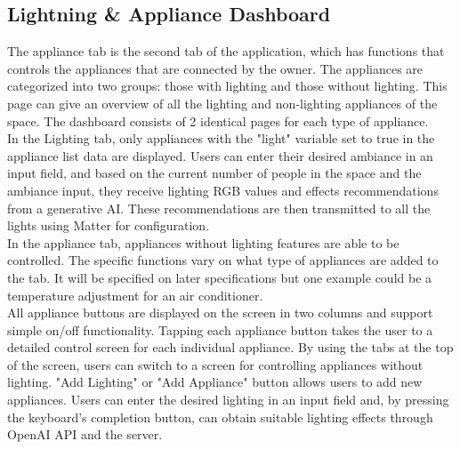 \documentclass[conference]{IEEEtran}
\begin{document}
    \subsection{Lightning \& Appliance Dashboard}
        The appliance tab is the second tab of the application, which has functions that controls the appliances that are connected by the owner. The appliances are categorized into two groups: those with lighting and those without lighting. This page can give an overview of all the lighting and non-lighting appliances of the space. The dashboard consists of 2 identical pages for each type of appliance.\\
        In the Lighting tab, only appliances with the "light" variable set to true in the appliance list data are displayed.  Users can enter their desired ambiance in an input field, and based on the current number of people in the space and the ambiance input, they receive lighting RGB values and effects recommendations from a generative AI. These recommendations are then transmitted to all the lights using Matter for configuration.\\
        In the appliance tab, appliances without lighting features are able to be controlled. The specific functions vary on what type of appliances are added to the tab. It will be specified on later specifications but one example could be a temperature adjustment for an air conditioner.\\
        All appliance buttons are displayed on the screen in two columns and support simple on/off functionality. Tapping each appliance button takes the user to a detailed control screen for each individual appliance. By using the tabs at the top of the screen, users can switch to a screen for controlling appliances without lighting. "Add Lighting" or "Add Appliance" button allows users to add new appliances. Users can enter the desired lighting in an input field and, by pressing the keyboard's completion button, can obtain suitable lighting effects through OpenAI API and the server.
\end{document}
